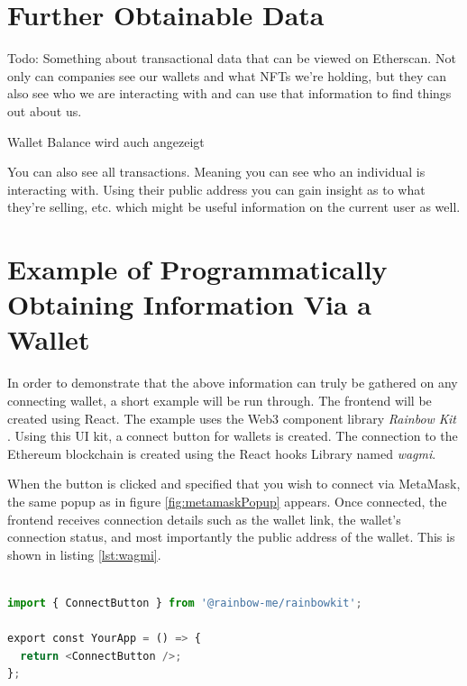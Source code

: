 %
%
\section{Further Obtainable Data}
\label{sec:methodology:moreData}

Todo: Something about transactional data that can be viewed on Etherscan. Not only can companies see our wallets and what NFTs we're holding, but they can also see who we are interacting with and can use that information to find things out about us.

Wallet Balance wird auch angezeigt

You can also see all transactions. Meaning you can see who an individual is interacting with. Using their public address you can gain insight as to what they're selling, etc. which might be useful information on the current user as well.

%
%
\section{Example of Programmatically Obtaining Information Via a Wallet}
\label{sec:methodology:code}
In order to demonstrate that the above information can truly be gathered on any connecting wallet, a short example will be run through. The frontend will be created using React. The example uses the Web3 component library \textit{Rainbow Kit} \cite{rainbowKit}. Using this UI kit, a connect button for wallets is created. The connection to the Ethereum blockchain is created using the React hooks Library named \textit{wagmi}.

When the button is clicked and specified that you wish to connect via MetaMask, the same popup as in figure \ref{fig:metamaskPopup} appears. Once connected, the frontend receives connection details such as the wallet link, the wallet's connection status, and most importantly the public address of the wallet. This is shown in listing \ref{lst:wagmi}.

\begin{center}
\begin{lstlisting}[label=lst:wagmi ,language=python, caption=An example of implementing a connect wallet button within the frontend of a webapp using the \textit{RainbowKit} UI Library \cite{rainbowKit}., captionpos=b]

import { ConnectButton } from '@rainbow-me/rainbowkit';

export const YourApp = () => {
  return <ConnectButton />;
};

\end{lstlisting}
\end{center}




